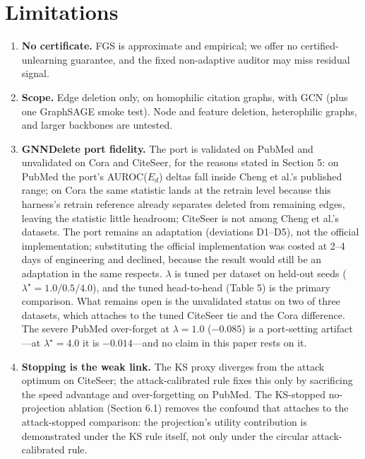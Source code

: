 \documentclass[pdflatex,sn-basic,Numbered]{sn-jnl}
\begin{document}
\section{Limitations}
\begin{enumerate}
\item \textbf{No certificate.} FGS is approximate and empirical; we offer no certified-unlearning guarantee, and the fixed non-adaptive auditor may miss residual signal.
\item \textbf{Scope.} Edge deletion only, on homophilic citation graphs, with GCN (plus one GraphSAGE smoke test). Node and feature deletion, heterophilic graphs, and larger backbones are untested.
\item \textbf{GNNDelete port fidelity.} The port is validated on PubMed and unvalidated on Cora and CiteSeer, for the reasons stated in Section 5: on PubMed the port's AUROC($E_d$) deltas fall inside Cheng et al.'s published range; on Cora the same statistic lands at the retrain level because this harness's retrain reference already separates deleted from remaining edges, leaving the statistic little headroom; CiteSeer is not among Cheng et al.'s datasets. The port remains an adaptation (deviations D1--D5), not the official implementation; substituting the official implementation was costed at 2--4 days of engineering and declined, because the result would still be an adaptation in the same respects. $\lambda$ is tuned per dataset on held-out seeds ($\lambda^\star = 1.0/0.5/4.0$), and the tuned head-to-head (Table 5) is the primary comparison. What remains open is the unvalidated status on two of three datasets, which attaches to the tuned CiteSeer tie and the Cora difference. The severe PubMed over-forget at $\lambda = 1.0$ ($-0.085$) is a port-setting artifact---at $\lambda^\star = 4.0$ it is $-0.014$---and no claim in this paper rests on it.
\item \textbf{Stopping is the weak link.} The KS proxy diverges from the attack optimum on CiteSeer; the attack-calibrated rule fixes this only by sacrificing the speed advantage and over-forgetting on PubMed. The KS-stopped no-projection ablation (Section 6.1) removes the confound that attaches to the attack-stopped comparison: the projection's utility contribution is demonstrated under the KS rule itself, not only under the circular attack-calibrated rule.

\end{enumerate}
\end{document}
